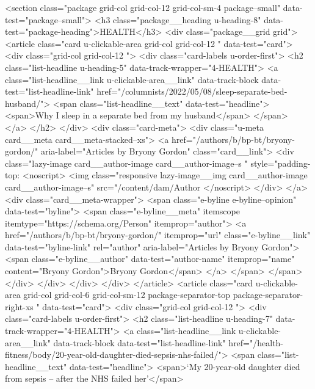 {{{<section class="package grid-col grid-col-12 grid-col-sm-4 package--small" data-test="package--small">
<h3 class="package__heading u-heading-8" data-test="package-heading">HEALTH</h3>
<div class="package__grid grid">
<article class="card u-clickable-area grid-col grid-col-12  " data-test="card">
<div class="grid-col grid-col-12  ">
<div class="card-labels u-order-first">
<h2 class="list-headline  u-heading-5" data-track-wrapper="4-HEALTH">
<a class="list-headline__link u-clickable-area__link" data-track-block data-test="list-headline-link" href="/columnists/2022/05/08/sleep-separate-bed-husband/">
<span class="list-headline__text" data-test="headline">
<span>Why I sleep in a separate bed from my husband</span>
</span>
</a>
</h2>
</div>
<div class="card-meta">
<div class="u-meta card__meta card__meta-stacked--xs">
<a href="/authors/b/bp-bt/bryony-gordon/" aria-label="Articles by Bryony Gordon" class="card__link">
<div class="lazy-image card__author-image card__author-image--s  " style="padding-top:%
<noscript>
<img class="responsive lazy-image__img card__author-image card__author-image--s" src="/content/dam/Author%
</noscript>
</div>
</a>
<div class="card__meta-wrapper">
<span class="e-byline e-byline--opinion" data-test="byline">
<span class="e-byline__meta" itemscope itemtype="https://schema.org/Person" itemprop="author">
<a href="/authors/b/bp-bt/bryony-gordon/" itemprop="url" class="e-byline__link" data-test="byline-link" rel="author" aria-label="Articles by Bryony Gordon">
<span class="e-byline__author" data-test="author-name" itemprop="name" content="Bryony Gordon">Bryony Gordon</span>
</a>
</span>
</span>
</div>
</div>
</div>
</div>
</article>
<article class="card u-clickable-area grid-col grid-col-6 grid-col-sm-12 package-separator-top package-separator-right-xs " data-test="card">
<div class="grid-col grid-col-12  ">
<div class="card-labels u-order-first">
<h2 class="list-headline  u-heading-7" data-track-wrapper="4-HEALTH">
<a class="list-headline__link u-clickable-area__link" data-track-block data-test="list-headline-link" href="/health-fitness/body/20-year-old-daughter-died-sepsis-nhs-failed/">
<span class="list-headline__text" data-test="headline">
<span>‘My 20-year-old daughter died from sepsis – after the NHS failed her’</span>
}}}
